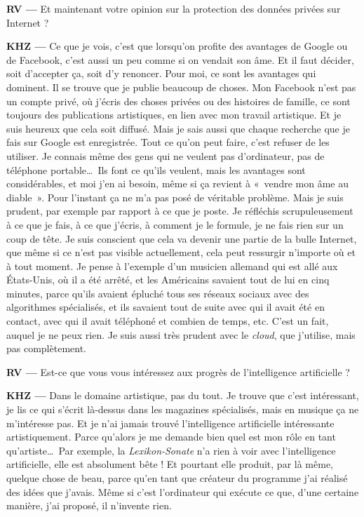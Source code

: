 \documentclass[a4paper,12pt]{article}
\newcommand{\guill}[1]{«~#1~»}
\begin{document}
\textbf{RV ---} Et maintenant votre opinion sur la protection des données privées sur Internet ?

\textbf{KHZ ---} Ce que je vois, c'est que lorsqu'on profite des avantages de Google ou de Facebook, c'est aussi un peu comme si on vendait son âme. Et il faut décider, soit d'accepter ça, soit d'y renoncer. Pour moi, ce sont les avantages qui dominent. Il se trouve que je publie beaucoup de choses. Mon Facebook n'est pas un compte privé, où j'écris des choses privées ou des histoires de famille, ce sont toujours des publications artistiques, en lien avec mon travail artistique. Et je suis heureux que cela soit diffusé. Mais je sais aussi que chaque recherche que je fais sur Google est enregistrée. Tout ce qu'on peut faire, c'est refuser de les utiliser. Je connais même des gens qui ne veulent pas d'ordinateur, pas de téléphone portable\dots~Ils font ce qu'ils veulent, mais les avantages sont considérables, et moi j'en ai besoin, même si ça revient à \guill{vendre mon âme au diable}. Pour l'instant ça ne m'a pas posé de véritable problème. Mais je suis prudent, par exemple par rapport à ce que je poste. Je réfléchis scrupuleusement à ce que je fais, à ce que j'écris, à comment je le formule, je ne fais rien sur un coup de tête. Je suis conscient que cela va devenir une partie de la bulle Internet, que même si ce n'est pas visible actuellement, cela peut ressurgir n'importe où et à tout moment. Je pense à l'exemple d'un musicien allemand qui est allé aux États-Unis, où il a été arrêté, et les Américains savaient tout de lui en cinq minutes, parce qu'ils avaient épluché tous ses réseaux sociaux avec des algorithmes spécialisés, et ils savaient tout de suite avec qui il avait été en contact, avec qui il avait téléphoné et combien de temps, etc. C'est un fait, auquel je ne peux rien. Je suis aussi très prudent avec le \emph{cloud}, que j'utilise, mais pas complètement.

\textbf{RV ---} Est-ce que vous vous intéressez aux progrès de l'intelligence artificielle ?

\textbf{KHZ ---} Dans le domaine artistique, pas du tout. Je trouve que c'est intéressant, je lis ce qui s'écrit là-dessus dans les magazines spécialisés, mais en musique ça ne m'intéresse pas. Et je n'ai jamais trouvé l'intelligence artificielle intéressante artistiquement. Parce qu'alors je me demande bien quel est mon rôle en tant qu'artiste\dots~Par exemple, la \emph{Lexikon-Sonate} n'a rien à voir avec l'intelligence artificielle, elle est absolument bête ! Et pourtant elle produit, par là même, quelque chose de beau, parce qu'en tant que créateur du programme j'ai réalisé des idées que j'avais. Même si c'est l'ordinateur qui exécute ce que, d'une certaine manière, j'ai proposé, il n'invente rien.
\end{document}
